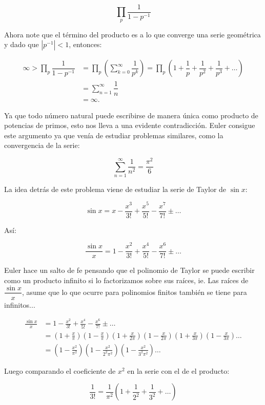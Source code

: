 $$\prod_p \dfrac{1}{1-p^{-1}}$$

Ahora note que el término del producto es a lo que converge una serie geométrica y dado que $|p^{-1}|<1$, entonces:

\begin{align*}
    \infty>\prod_p \dfrac{1}{1-p^{-1}}&=\prod_p \left(\sum_{k=0}^{\infty}\dfrac{1}{p^k}\right)=\prod_p \left(1+\dfrac{1}{p}+\dfrac{1}{p^2}+\dfrac{1}{p^3}+\ldots\right)\\
    &=\sum_{n=1}^{\infty}\dfrac{1}{n}\\
    &=\infty
.\end{align*}

Ya que todo número natural puede escribirse de manera única como producto de potencias de primos, esto nos lleva a una evidente contradicción. Euler consigue este argumento ya que venía de estudiar problemas similares, como la convergencia de la serie:

$$\sum_{n=1}^{\infty}\frac{1}{n^2}=\frac{\pi^2}{6}$$

La idea detrás de este problema viene de estudiar la serie de Taylor de $\sin x$:

$$\sin x=x-\frac{x^3}{3!}+\frac{x^5}{5!}-\frac{x^7}{7!}\pm \ldots$$

Así:

$$\frac{\sin x}{x}=1-\frac{x^2}{3!}+\frac{x^4}{5!}-\frac{x^6}{7!}\pm\ldots$$

Euler hace un salto de fe pensando que el polinomio de Taylor se puede escribir como un producto infinito si lo factorizamos sobre sus raíces, ie. Las  raíces de $\dfrac{\sin x}{x}$, asume que lo que ocurre para polinomios finitos también se tiene para infinitos...

\begin{align*}
    \frac{\sin x}{x}&=1-\frac{x^2}{3!}+\frac{x^4}{5!}-\frac{x^6}{7!}\pm\ldots\\
    &=\left(1+\frac{x}{\pi}\right)\left(1-\frac{x}{\pi}\right)\left(1+\frac{x}{2\pi}\right)\left(1-\frac{x}{2\pi}\right)\left(1+\frac{x}{3\pi}\right)\left(1-\frac{x}{3\pi}\right)\ldots\\
&=\left(1-\frac{x^2}{\pi^2}\right)\left(1-\frac{x^2}{2^2\pi^2}\right)\left(1-\frac{x^2}{3^2\pi^2}\right)\ldots
\end{align*}

Luego comparando el coeficiente de $x^2$ en la serie con el de el producto:

$$\frac{1}{3!}=\frac{1}{\pi^2}\left(1+\frac{1}{2^2}+\frac{1}{3^2}+\ldots\right)$$

